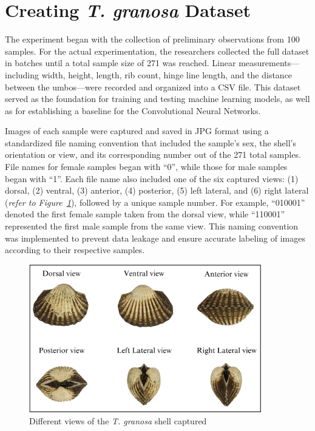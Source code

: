 \section{Creating \textit{T. granosa} Dataset}
\label{sec:dataset}

The experiment began with the collection of preliminary observations from 100 \Tgranosa samples. For the actual experimentation, the researchers collected the full dataset in batches until a total sample size of 271 \Tgranosa was reached. Linear measurements—including width, height, length, rib count, hinge line length, and the distance between the umbos—were recorded and organized into a CSV file. This dataset served as the foundation for training and testing machine learning models, as well as for establishing a baseline for the Convolutional Neural Networks.

Images of each sample were captured and saved in JPG format using a standardized file naming convention that included the sample's sex, the shell's orientation or view, and its corresponding number out of the 271 total samples. File names for female \Tgranosa samples began with “0”, while those for male samples began with “1”. Each file name also included one of the six captured views: (1) dorsal, (2) ventral, (3) anterior, (4) posterior, (5) left lateral, and (6) right lateral (\textit{refer to Figure~\ref{fig:granosa_views}}), followed by a unique sample number. For example, “010001” denoted the first female sample taken from the dorsal view, while “110001” represented the first male sample from the same view. This naming convention was implemented to prevent data leakage and ensure accurate labeling of images according to their respective samples.

\begin{figure}[!htbp]
	\centering
	\includegraphics[width=0.9\textwidth]{figures/view.png}
	\caption{Different views of the \textit{T. granosa} shell captured}
	\label{fig:granosa_views}
\end{figure}

